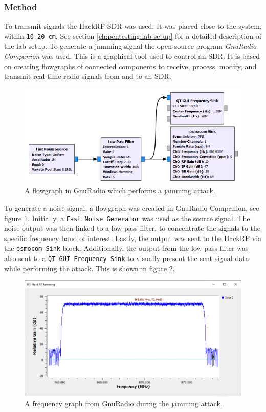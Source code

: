 \subsubsection{Method}
To transmit signals the HackRF SDR was used. It was placed close to the system, within \texttt{10-20 cm}. See section \ref{ch:pentesting:lab-setup} for a detailed description of the lab setup. To generate a jamming signal the open-source program \textit{GnuRadio Companion} was used. This is a graphical tool used to control an SDR. It is based on creating flowgraphs of connected components to receive, process, modify, and transmit real-time radio signals from and to an SDR.
\begin{figure}[!ht]
    \centering
    \includegraphics[width=\textwidth]{images/6-pentesting/jamming-flowgraph.png}
    \caption{A flowgraph in GnuRadio which performs a jamming attack.}
    \label{fig:gnuradio-jamming-flowgraph}
\end{figure}

To generate a noise signal, a flowgraph was created in GnuRadio Companion, see figure \ref{fig:gnuradio-jamming-flowgraph}. Initially, a \texttt{Fast Noise Generator} was used as the source signal. The noise output was then linked to a low-pass filter, to concentrate the signals to the specific frequency band of interest. Lastly, the output was sent to the HackRF via the \texttt{osmocom Sink} block. Additionally, the output from the low-pass filter was also sent to a \texttt{QT GUI Frequency Sink} to visually present the sent signal data while performing the attack. This is shown in figure \ref{fig:gnuradio-frequency-graph}.
\begin{figure}[!ht]
    \centering
    \includegraphics[width=\textwidth]{images/6-pentesting/jamming-output-graph.png}
    \caption{A frequency graph from GnuRadio during the jamming attack.}
    \label{fig:gnuradio-frequency-graph}
\end{figure}


